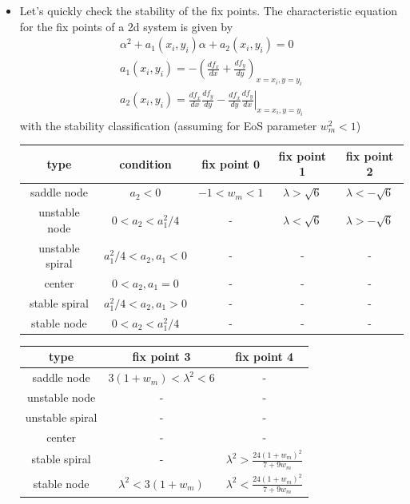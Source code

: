 \documentclass[10pt,a4paper]{article}
\theoremstyle{definition}
\begin{document}
\begin{itemize}
\item Let's quickly check the stability of the fix points. The characteristic equation for the fix points of a 2d system is given by
\begin{align}
    \alpha^2+a_1(x_i,y_i)\alpha+a_2(x_i,y_i)=0\\
    a_1(x_i,y_i)=-\left(\frac{df_x}{dx}+\frac{df_y}{dy}\right)_{x=x_i,y=y_i}\\
    a_2(x_i,y_i)=\left.\frac{df_x}{dx}\frac{df_y}{dy}-\frac{df_x}{dy}\frac{df_y}{dx}\right|_{x=x_i,y=y_i}
\end{align}
with the stability classification (assuming for EoS parameter $w_m^2<1$)
\begin{center}
\begin{tabular}{ c c c c c}
\hline\hline
 type            & condition            & fix point 0 & fix point 1 & fix point 2   \\ \hline
 saddle node     & $a_2<0$              & $-1<w_m<1$ & $\lambda>\sqrt{6}$ & $\lambda<-\sqrt{6}$\\  
 unstable node   & $0<a_2<a_1^2/4$      & - & $\lambda<\sqrt{6}$ & $\lambda>-\sqrt{6}$\\  
 unstable spiral & $a_1^2/4<a_2, a_1<0$ & - & - & -\\
 center          & $0<a_2, a_1=0$       & - & - & -\\
 stable spiral   & $a_1^2/4<a_2, a_1>0$ & - & - & -\\
 stable node     & $0<a_2<a_1^2/4$      & - & - & -\\ \hline\hline
\end{tabular}
\end{center}

\begin{center}
\begin{tabular}{ c c c }
\hline\hline
 type            & fix point 3 & fix point 4  \\ \hline
 saddle node     & $3(1+w_m)<\lambda^2<6$ & -\\  
 unstable node   & - & -\\
 unstable spiral & - & -\\
 center          & - & -\\
 stable spiral   & - & $\lambda^2>\frac{24(1+w_m)^2}{7+9w_m}$\\
 stable node     & $\lambda^2<3(1+w_m)$ & $\lambda^2<\frac{24(1+w_m)^2}{7+9w_m}$ \\ \hline\hline
\end{tabular}
\end{center}

\end{itemize} 
\end{document}
